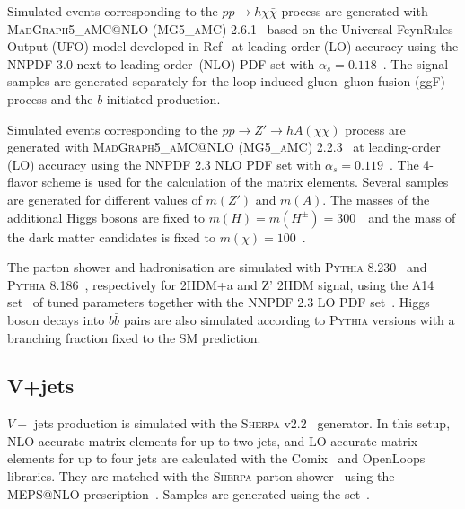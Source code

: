 \par Simulated events corresponding to the $pp\to h\chi\bar{\chi}$ process are generated with \textsc{MadGraph5\_aMC@NLO} (\textsc{MG5\_aMC}) 2.6.1~\cite{Alwall:2014hca} 
based on the Universal FeynRules Output (UFO) model developed in Ref~\cite{Abe:2018bpo} at leading-order (LO) accuracy using the NNPDF 3.0 next-to-leading order~(NLO) PDF set with $\alpha_s=0.118$~\cite{Ball:2014uwa}. 
The signal samples are generated separately for the loop-induced gluon--gluon fusion (ggF) process and the $b$-initiated production. 

\par Simulated events corresponding to the $pp\to Z'\to h A(\chi\bar{\chi})$ process are generated with \textsc{MadGraph5\_aMC@NLO} (\textsc{MG5\_aMC}) 2.2.3~\cite{Alwall:2014hca} 
at leading-order (LO) accuracy using the NNPDF 2.3 NLO PDF set with $\alpha_s=0.119$~\cite{Ball:2012cx}. 
The 4-flavor scheme is used for the calculation of the matrix elements. Several samples are generated for different values of $m(Z')$ and $m(A)$.
The masses of the additional Higgs bosons are fixed to $m(H)=m(H^{\pm})=300$~\GeV~and the mass of the dark matter candidates is fixed to $m(\chi)=100$~\GeV. 

\par The parton shower and hadronisation are simulated with \textsc{Pythia} 8.230~\cite{Sjostrand:2014zea} and \textsc{Pythia} 8.186~\cite{Sjostrand:2007gs}, respectively for 2HDM+a and Z' 2HDM signal,
using the A14 set~\cite{ATL-PHYS-PUB-2014-021} of tuned parameters together with the NNPDF 2.3 LO PDF set~\cite{Ball:2011mu}. 
Higgs boson decays into $b\bar{b}$ pairs are also simulated according to \textsc{Pythia} versions with a branching fraction fixed to the SM prediction.

\subsection{V+jets}

\par $V+$ jets production is simulated with the \textsc{Sherpa} v2.2~\cite{Bothmann:2019yzt} generator. 
In this setup, NLO-accurate matrix elements for up to two jets, and LO-accurate matrix elements for up to four jets are calculated with the Comix~\cite{Gleisberg:2008fv} and OpenLoops~\cite{Cascioli:2011va,Denner:2016kdg} libraries. 
They are matched with the \textsc{Sherpa} parton shower~\cite{Schumann:2007mg} using the MEPS@NLO prescription~\cite{Hoeche:2011fd,Hoeche:2012yf,Catani:2001cc,Hoeche:2009rj}.
Samples are generated using the \nnpdfnnlo set~\cite{Ball:2014uwa}.

